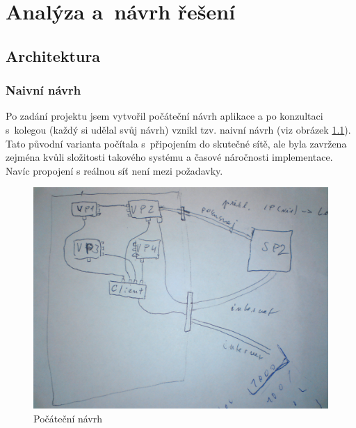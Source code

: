 \chapter{Analýza a~návrh řešení}\label{kap:analyza}



\section{Architektura}

\subsection{Naivní návrh}
Po zadání projektu jsem vytvořil počáteční návrh aplikace a po konzultaci s~kolegou (každý si udělal svůj návrh) vznikl tzv. naivní návrh (viz obrázek \ref{fig:navrh}). Tato původní varianta počítala s~připojením do skutečné sítě, ale byla zavržena zejména kvůli složitosti takového systému a časové náročnosti implementace. Navíc propojení s reálnou síť není mezi požadavky.

\begin{figure}[h]
\begin{center}
\includegraphics[width=12cm]{figures/navrh}
\caption{Počáteční návrh}
\label{fig:navrh}
\end{center}
\end{figure}

